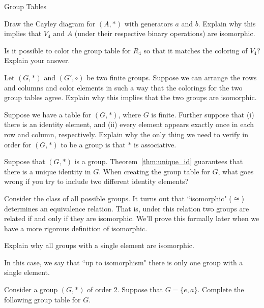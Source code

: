 \begin{section}{Group Tables}
\begin{exercise}
Draw the Cayley diagram for \((A,*)\) with generators \(a\) and \(b\).  Explain why this implies that \(V_4\) and \(A\) (under their respective binary operations) are isomorphic.  
\end{exercise}

\begin{exercise}
Is it possible to color the group table for \(R_4\) so that it matches the coloring of \(V_4\)?  Explain your answer.
\end{exercise}

\begin{problem}\label{prob:iso_same_group_table}
Let \((G,*)\) and \((G',\circ)\) be two finite groups.  Suppose we can arrange the rows and columns and color elements in such a way that the colorings for the two group tables agree.  Explain why this implies that the two groups are isomorphic.
\end{problem}

\begin{problem}
Suppose we have a table for \((G,*)\), where \(G\) is finite.  Further suppose that (i) there is an identity element, and (ii) every element appears exactly once in each row and column, respectively.  Explain why the only thing we need to verify in order for \((G,*)\) to be a group is that \(*\) is associative.
\end{problem}

\begin{problem}%
Suppose that \((G,*)\) is a group.  Theorem~\ref{thm:unique_id} guarantees that there is a unique identity in \(G\).  When creating the group table for \(G\), what goes wrong if you try to include two different identity elements?
\end{problem}

Consider the class of all possible groups.  It turns out that ``isomorphic" (\(\cong\)) determines an equivalence relation.  That is, under this relation two groups are related if and only if they are isomorphic.  We'll prove this formally later when we have a more rigorous definition of isomorphic.

\begin{problem}
Explain why all groups with a single element are isomorphic.
\end{problem}

In this case, we say that ``up to isomorphism" there is only one group with a single element.

\begin{problem}
Consider a group \((G,*)\) of order 2.  Suppose that \(G=\{e,a\}\).  Complete the following group table for \(G\).


\end{problem}
\end{section}
